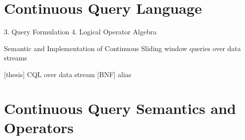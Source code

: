 \section{Continuous Query Language}
3. Query Formulation 
4. Logical Operator Algebra

Semantic and Implementation of Continuous Sliding window queries over data streams

[thesis] CQL over data stream [BNF] alias


\section{Continuous Query Semantics and Operators}



